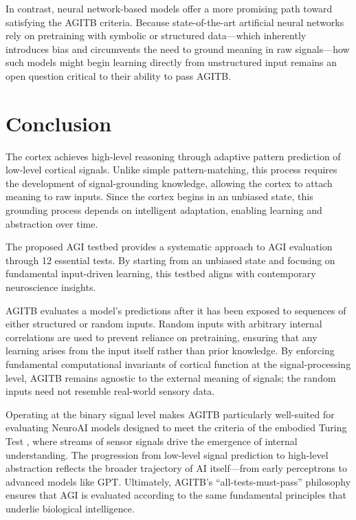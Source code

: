 \documentclass{article}
\begin{document}
In contrast, neural network-based models offer a more promising path toward satisfying the AGITB criteria. Because state-of-the-art artificial neural networks rely on pretraining with symbolic or structured data—which inherently introduces bias and circumvents the need to ground meaning in raw signals—how such models might begin learning directly from unstructured input remains an open question critical to their ability to pass AGITB.


\section{Conclusion}

The cortex achieves high-level reasoning through adaptive pattern prediction of low-level cortical signals. Unlike simple pattern-matching, this process requires the development of signal-grounding knowledge, allowing the cortex to attach meaning to raw inputs. Since the cortex begins in an unbiased state, this grounding process depends on intelligent adaptation, enabling learning and abstraction over time.

The proposed AGI testbed provides a systematic approach to AGI evaluation through 12 essential tests. By starting from an unbiased state and focusing on fundamental input-driven learning, this testbed aligns with contemporary neuroscience insights.

AGITB evaluates a model’s predictions after it has been exposed to sequences of either structured or random inputs. Random inputs with arbitrary internal correlations are used to prevent reliance on pretraining, ensuring that any learning arises from the input itself rather than prior knowledge. By enforcing fundamental computational invariants of cortical function at the signal-processing level, AGITB remains agnostic to the external meaning of signals; the random inputs need not resemble real-world sensory data.

Operating at the binary signal level makes AGITB particularly well-suited for evaluating NeuroAI models designed to meet the criteria of the embodied Turing Test \cite{Zador2023}, where streams of sensor signals drive the emergence of internal understanding. The progression from low-level signal prediction to high-level abstraction reflects the broader trajectory of AI itself—from early perceptrons to advanced models like GPT. Ultimately, AGITB’s “all-tests-must-pass” philosophy ensures that AGI is evaluated according to the same fundamental principles that underlie biological intelligence.
\end{document}
